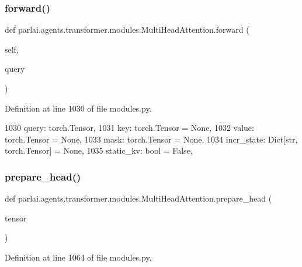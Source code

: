 \subsubsection{\texorpdfstring{forward()}{forward()}}
{\footnotesize\ttfamily def parlai.\+agents.\+transformer.\+modules.\+Multi\+Head\+Attention.\+forward (\begin{DoxyParamCaption}\item[{}]{self,  }\item[{}]{query }\end{DoxyParamCaption})}



Definition at line 1030 of file modules.\+py.


\begin{DoxyCode}
1030         query: torch.Tensor,
1031         key: torch.Tensor = \textcolor{keywordtype}{None},
1032         value: torch.Tensor = \textcolor{keywordtype}{None},
1033         mask: torch.Tensor = \textcolor{keywordtype}{None},
1034         incr\_state: Dict[str, torch.Tensor] = \textcolor{keywordtype}{None},
1035         static\_kv: bool = \textcolor{keyword}{False},
\end{DoxyCode}
\mbox{\label{classparlai_1_1agents_1_1transformer_1_1modules_1_1MultiHeadAttention_aaaa65b1ea63856616e7b9d75b0e794a7}} 
\subsubsection{\texorpdfstring{prepare\+\_\+head()}{prepare\_head()}}
{\footnotesize\ttfamily def parlai.\+agents.\+transformer.\+modules.\+Multi\+Head\+Attention.\+prepare\+\_\+head (\begin{DoxyParamCaption}\item[{}]{tensor }\end{DoxyParamCaption})}



Definition at line 1064 of file modules.\+py.


